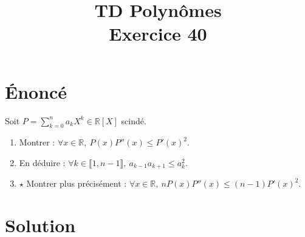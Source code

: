 \documentclass[french]{article}
\title{TD Polynômes \\ Exercice 40}
\date{}
\newcommand{\R}{\mathbb{R}}
\begin{document}
\maketitle

\section{Énoncé}
Soit $P=\displaystyle\sum_{k=0}^{n}a_kX^k\in\R[X]$ scindé.
\begin{enumerate}
	\item Montrer : $\forall x\in\R,\ P(x)P''(x)\leqslant P'(x)^2$.
	\item En déduire : $\forall k\in\llbracket1,n-1\rrbracket,\ a_{k-1}a_{k+1}\leqslant a_k^2$.
	\item $\star$ Montrer plus précisément : $\forall x\in\R,\ nP(x)P''(x)\leqslant(n-1)P'(x)^2$.
\end{enumerate}
\section{Solution}
\end{document}
